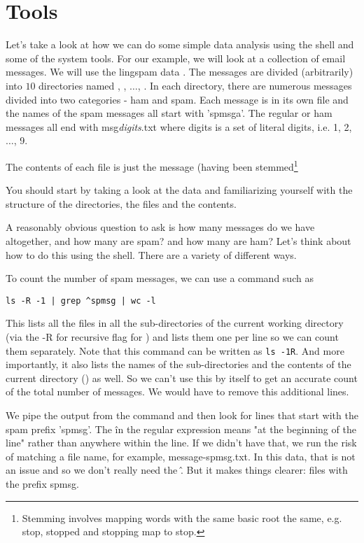 \section{Tools}

Let's take a look at how we can do some simple data analysis using the
shell and some of the system tools.  For our example, we will look at
a collection of email messages.  We will use the lingspam data
\cite{lingspam}.  The messages are divided (arbitrarily) into $10$
directories named , , $\ldots$, .
In each directory, there are numerous messages divided into two
categories - ham and spam.  Each message is in its own file and the
names of the spam messages all start with 'spmsga'.  The regular or
ham messages all end with msg\textit{digits}.txt where digits is a set
of literal digits, i.e. 1, 2, $\ldots$, 9.

The contents of each file is just the message (having been
stemmed\footnote{Stemming involves mapping words with the same basic
  root the same, e.g. stop, stopped and stopping map to stop.}

You should start by taking a look at the data and familiarizing
yourself with the structure of the directories, the files and the
contents.


A reasonably obvious question to ask is how many messages do we have
altogether, and how many are spam? and how many are ham?
Let's think about how to do this using the shell.
There are a variety of different ways.

To count the number of spam messages, we can use 
a command such as
\begin{verbatim}
ls -R -1 | grep ^spmsg | wc -l
\end{verbatim}
This lists all the files in all the sub-directories of the current
working directory (via the -R for recursive flag for ) and
lists them one per line so we can count them separately.  Note that
this  command can be written as \verb+ls -1R+.  And more
importantly, it also lists the names of the sub-directories and the
contents of the current directory () as well.  So we can't
use this by itself to get an accurate count of the total number of
messages. We would have to remove this additional lines.

We pipe the output from the  command and then look for lines
that start with the spam prefix 'spmsg'.  The \^ in the regular
expression means "at the beginning of the line" rather than anywhere
within the line. If we didn't have that, we run the risk of matching a
file name, for example, message-spmsg.txt.  In this data, that is not
an issue and so we don't really need the \^.  But it makes things
clearer: files with the prefix spmsg.

